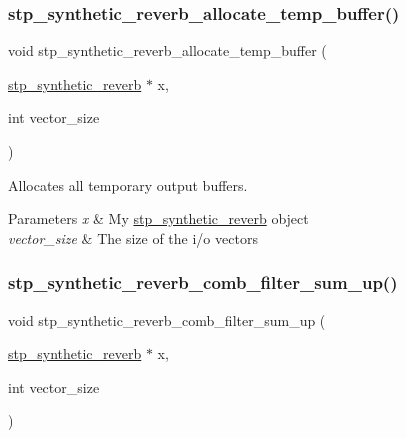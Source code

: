 \subsubsection{\texorpdfstring{stp\+\_\+synthetic\+\_\+reverb\+\_\+allocate\+\_\+temp\+\_\+buffer()}{stp\_synthetic\_reverb\_allocate\_temp\_buffer()}}
{\footnotesize\ttfamily void stp\+\_\+synthetic\+\_\+reverb\+\_\+allocate\+\_\+temp\+\_\+buffer (\begin{DoxyParamCaption}\item[{\hyperlink{structstp__synthetic__reverb}{stp\+\_\+synthetic\+\_\+reverb} $\ast$}]{x,  }\item[{int}]{vector\+\_\+size }\end{DoxyParamCaption})\hspace{0.3cm}{\ttfamily [related]}}



Allocates all temporary output buffers. ~\newline
 


\begin{DoxyParams}{Parameters}
{\em x} & My \hyperlink{structstp__synthetic__reverb}{stp\+\_\+synthetic\+\_\+reverb} object ~\newline
 \\
\hline
{\em vector\+\_\+size} & The size of the i/o vectors ~\newline
 \\
\hline
\end{DoxyParams}
\mbox{\label{structstp__synthetic__reverb_ac3ac205de199cf3f87ba7618808b034e}} 
\subsubsection{\texorpdfstring{stp\+\_\+synthetic\+\_\+reverb\+\_\+comb\+\_\+filter\+\_\+sum\+\_\+up()}{stp\_synthetic\_reverb\_comb\_filter\_sum\_up()}}
{\footnotesize\ttfamily void stp\+\_\+synthetic\+\_\+reverb\+\_\+comb\+\_\+filter\+\_\+sum\+\_\+up (\begin{DoxyParamCaption}\item[{\hyperlink{structstp__synthetic__reverb}{stp\+\_\+synthetic\+\_\+reverb} $\ast$}]{x,  }\item[{int}]{vector\+\_\+size }\end{DoxyParamCaption})\hspace{0.3cm}{\ttfamily [related]}}



